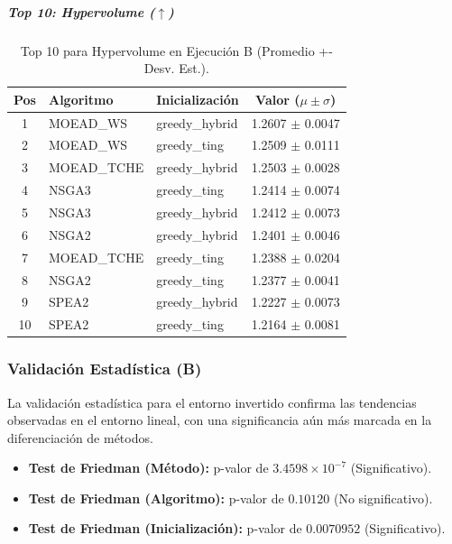\documentclass[a4paper,10pt]{article}
\begin{document}
\subparagraph{Top 10: Hypervolume ($\uparrow$)}
\begin{table}[H]
    \centering
    \begin{tabular}{cllc}
        \toprule
        Pos & Algoritmo & Inicialización & Valor ($\mu \pm \sigma$) \\
        \midrule
        1 & MOEAD\_WS & greedy\_hybrid & 1.2607 $\pm$ 0.0047 \\
        2 & MOEAD\_WS & greedy\_ting & 1.2509 $\pm$ 0.0111 \\
        3 & MOEAD\_TCHE & greedy\_hybrid & 1.2503 $\pm$ 0.0028 \\
        4 & NSGA3 & greedy\_ting & 1.2414 $\pm$ 0.0074 \\
        5 & NSGA3 & greedy\_hybrid & 1.2412 $\pm$ 0.0073 \\
        6 & NSGA2 & greedy\_hybrid & 1.2401 $\pm$ 0.0046 \\
        7 & MOEAD\_TCHE & greedy\_ting & 1.2388 $\pm$ 0.0204 \\
        8 & NSGA2 & greedy\_ting & 1.2377 $\pm$ 0.0041 \\
        9 & SPEA2 & greedy\_hybrid & 1.2227 $\pm$ 0.0073 \\
        10 & SPEA2 & greedy\_ting & 1.2164 $\pm$ 0.0081 \\
        \bottomrule
    \end{tabular}
    \caption{Top 10 para Hypervolume en Ejecución B (Promedio +- Desv. Est.).}
\end{table}


\subsubsection{Validación Estadística (B)}
La validación estadística para el entorno invertido confirma las tendencias observadas en el entorno lineal, con una significancia aún más marcada en la diferenciación de métodos.

\begin{itemize}
    \item \textbf{Test de Friedman (Método):} p-valor de $3.4598 \times 10^{-7}$ (Significativo).
    \item \textbf{Test de Friedman (Algoritmo):} p-valor de $0.10120$ (No significativo).
    \item \textbf{Test de Friedman (Inicialización):} p-valor de $0.0070952$ (Significativo).
\end{itemize}
\end{document}
